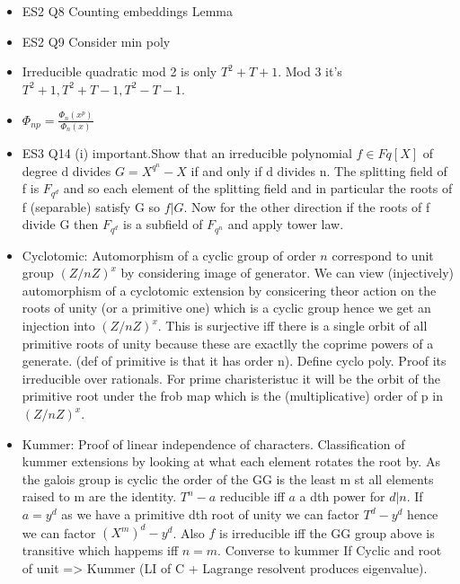 \documentclass{article}
\begin{document}
\begin{itemize}
        \item ES2 Q8 Counting embeddings Lemma
        \item ES2 Q9 Consider min poly 
        \item Irreducible quadratic mod 2 is only $T^2+T+1$. Mod 3 it's $T^2+1, T^2+T-1, T^2-T-1$.
        \item $\Phi_{np}=\frac{\Phi_n(x^p)}{\Phi_n(x)}$
        \item ES3 Q14 (i) important.Show that an irreducible polynomial $f \in Fq[X]$ of degree d divides $G=X^{q^n} - X $ if and only if d divides n. The splitting field of f is $F_{q^d}$ and so each element of the splitting field and in particular the roots of f (separable) satisfy G so $f|G$. Now for the other direction if the roots of f divide G then $F_{q^d}$ is a subfield of $F_{q^n}$ and apply tower law.
        \item Cyclotomic: Automorphism of a cyclic group of order $n$ correspond to unit group $(Z/nZ) ^x$ by considering image of generator. We can view (injectively) automorphism of a cyclotomic extension by consicering theor action on the roots of unity (or a primitive one) which is a cyclic group hence we get an injection into $(Z/nZ) ^x$. This is surjective iff there is a single orbit of all primitive roots of unity because these are exactlly the coprime powers of a generate. (def of primitive is that it has order n). Define cyclo poly. Proof its irreducible over rationals. For prime charisteristuc it will be the orbit of the primitive root under the frob map which is the (multiplicative) order of p in $(Z/nZ) ^x$. 
        \item Kummer: Proof of linear independence of characters. Classification of kummer extensions by looking at what each element rotates the root by. As the galois group is cyclic the order of the GG is the least m st all elements raised to m are the identity. $T^n-a$ reducible iff $a$ a dth power for $d|n$. If $a=y^d$ as we have a primitive dth root of unity we can factor $T^d-y^d$ hence we can factor $(X^m)^d-y^d$. Also $f$ is irreducible iff the GG group above is transitive which happems iff $n=m$. Converse to kummer If Cyclic and root of unit => Kummer (LI of C + Lagrange resolvent produces eigenvalue).


\end{itemize}
\end{document}
